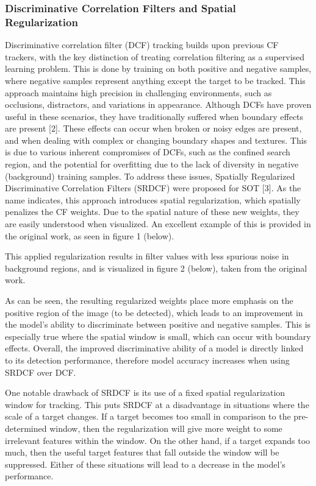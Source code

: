 \documentclass{article}
\begin{document}
\subsubsection{Discriminative Correlation Filters and Spatial Regularization}

Discriminative correlation filter (DCF) tracking builds upon previous CF trackers, with the key distinction of treating correlation filtering as a supervised learning problem. This is done by training on both positive and negative samples, where negative samples represent anything except the target to be tracked. This approach maintains high precision in challenging environments, such as occlusions, distractors, and variations in appearance. Although DCFs have proven useful in these scenarios, they have traditionally suffered when boundary effects are present [2]. These effects can occur when broken or noisy edges are present, and when dealing with complex or changing boundary shapes and textures. This is due to various inherent compromises of DCFs, such as the confined search region, and the potential for overfitting due to the lack of diversity in negative (background) training samples. To address these issues, Spatially Regularized Discriminative Correlation Filters (SRDCF) were proposed for SOT [3]. As the name indicates, this approach introduces spatial regularization, which spatially penalizes the CF weights. Due to the spatial nature of these new weights, they are easily understood when visualized. An excellent example of this is provided in the original work, as seen in figure 1 (below).


This applied regularization results in filter values with less spurious noise in background regions, and is visualized in figure 2 (below), taken from the original work.


As can be seen, the resulting regularized weights place more emphasis on the positive region of the image (to be detected), which leads to an improvement in the model's ability to discriminate between positive and negative samples. This is especially true where the spatial window is small, which can occur with boundary effects. Overall, the improved discriminative ability of a model is directly linked to its detection performance, therefore model accuracy increases when using SRDCF over DCF. 

One notable drawback of SRDCF is its use of a fixed spatial regularization window for tracking. This puts SRDCF at a disadvantage in situations where the scale of a target changes. If a target becomes too small in comparison to the pre-determined window, then the regularization will give more weight to some irrelevant features within the window. On the other hand, if a target expands too much, then the useful target features that fall outside the window will be suppressed. Either of these situations will lead to a decrease in the model's performance.
\end{document}
